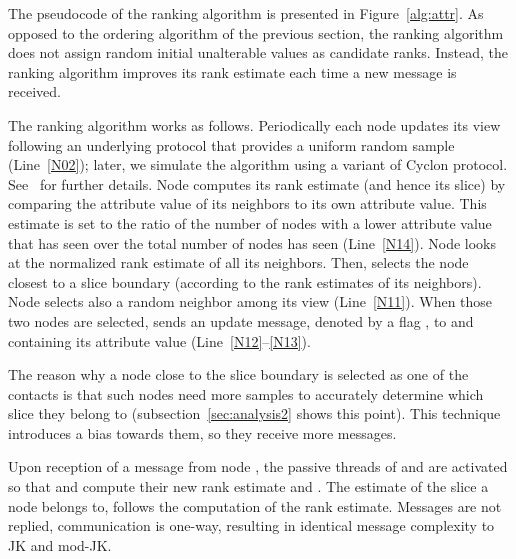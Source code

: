 \documentclass[times,10pt,twocolumn]{article}
\begin{document}

The pseudocode of the ranking algorithm is presented in Figure~\ref{alg:attr}.
As opposed to the ordering algorithm of the previous section, the ranking
algorithm does not assign random initial unalterable values as candidate ranks.
Instead, the ranking algorithm improves its rank estimate each
time a new message is received.

The ranking algorithm works as follows.
Periodically each node  updates its view  following 
an underlying protocol that provides a uniform random sample (Line~\ref{N02}); later, we simulate the algorithm using
a variant of Cyclon protocol. See~\cite{FGJKR06b} for further details.
Node  computes its rank estimate (and hence its slice)
by comparing the attribute value of its neighbors to its own attribute value.
This estimate is set to the ratio of the number of nodes with a lower 
attribute value that  has seen over the total number of nodes  has seen (Line~\ref{N14}).
Node  looks at the normalized rank estimate of all its neighbors.
Then, 
selects the node  closest to a slice boundary (according to the rank 
estimates of its neighbors).
Node  selects also a random neighbor  among its view (Line~\ref{N11}).
When those two nodes are selected,  sends an update message, denoted by a flag , 
to  and 
containing its attribute value (Line~\ref{N12}--\ref{N13}).

The reason why a node close to the slice boundary is selected as one of the
contacts is that such nodes need more samples to accurately determine
which slice they belong to (subsection~\ref{sec:analysis2} shows this point).
This technique introduces a bias towards them, so they receive more messages.

Upon reception of a message from node , the passive threads of  and 
 are activated so that  and  compute their new rank estimate 
 and .  The estimate of the slice a node belongs to,
follows the computation of the rank estimate.
Messages are not replied, communication is one-way, resulting in identical message
complexity to JK and mod-JK.
\end{document}
